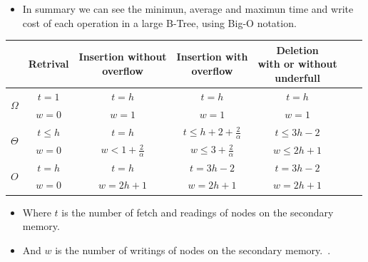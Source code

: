 \begin{frame}
    \framebreak{}

    \begin{itemize}
        \item In summary we can see the minimun, average and maximun time and write cost of each operation in a large B-Tree, using Big-O notation.
    \end{itemize}
    \begin{center}
        \begin{tabular}{@{}ccccccc}
            \toprule
                           & Retrival & \specialcell{Insertion without \\ overflow} & \specialcell{Insertion with \\ overflow} & \specialcell{Deletion \\ with or without \\ underfull} \\
                \midrule
                \multirow[c]{2}{*}{\(\Omega\)} 
                    & \(t = 1\) & \(t = h \) & \(t = h\) & \(t = h\) \\
                    & \(w = 0\) & \(w = 1\) & \(w = 1\) & \(w = 1\) \\
                \midrule
                \multirow[c]{2}{*}{\(\Theta\)} 
                    & \(t \leq h\) & \(t = h\) & \(t \leq h + 2 + \frac{2}{\alpha}\) & \(t \leq 3h - 2\) \\
                    & \(w = 0\) & \(w < 1 + \frac{2}{\alpha}\) & \(w \leq 3 + \frac{2}{\alpha}\) & \(w \leq 2h +1\) \\
                \midrule
                \multirow[c]{2}{*}{\(O\)}
                    & \(t = h\) & \(t = h\) & \(t = 3h - 2\) & \(t = 3h - 2\) \\
                    & \(w = 0\) & \(w = 2h + 1\) & \(w = 2h + 1\) & \(w = 2h + 1\) \\
            \toprule
        \end{tabular}
    \end{center}
    \begin{itemize}
        \item Where \(t\) is the number of fetch and readings of nodes on the secondary memory.
        \item And \(w\) is the number of writings of nodes on the secondary memory.~\parencite{bayer_organization_1972}.
    \end{itemize}\end{frame}
